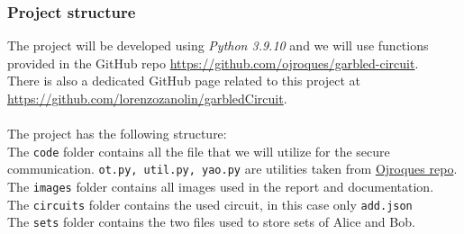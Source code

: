 \documentclass[12pt]{article}
\newcommand{\inlinecode}{\texttt}
\begin{document}
\subsubsection{Project structure}
The project will be developed using \textit{Python 3.9.10} and we will use functions provided in the GitHub repo \url{https://github.com/ojroques/garbled-circuit}\label{ref:git}.\\
There is also a dedicated GitHub page related to this project at \url{https://github.com/lorenzozanolin/garbledCircuit}\label{zanoGit}.\\ \\ The project has the following structure:\\
The \inlinecode{code} folder contains all the file that we will utilize for the secure communication. \inlinecode{ot.py, util.py, yao.py} are utilities taken from \hyperref[ref:git]{Ojroques repo}.\\
The \inlinecode{images} folder contains all images used in the report and documentation.\\
The \inlinecode{circuits} folder contains the used circuit, in this case only \inlinecode{add.json}\\
The \inlinecode{sets} folder contains the two files used to store sets of Alice and Bob.\\
\\ \\
\end{document}
